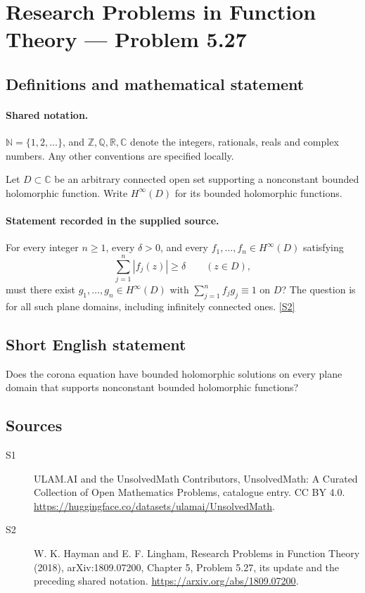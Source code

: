 \documentclass[11pt]{article}
\newcommand{\sref}[2]{\hyperlink{source:#1:#2}{[S#2]}}
\begin{document}
\section{Research Problems in Function Theory — Problem 5.27}\label{statement}

\subsection{Definitions and mathematical statement}

\paragraph{Shared notation.}$\mathbb N=\{1,2,\ldots\}$, and $\mathbb Z,\mathbb Q,\mathbb R,\mathbb C$ denote the integers, rationals, reals and complex numbers. Any other conventions are specified locally.


Let $D\subset\mathbb C$ be an arbitrary connected open set supporting a nonconstant bounded holomorphic function. Write $H^\infty(D)$ for its bounded holomorphic functions.
\paragraph{Statement recorded in the supplied source.}
For every integer $n\ge1$, every $\delta>0$, and every $f_1,\ldots,f_n\in H^\infty(D)$ satisfying
\[\sum_{j=1}^n|f_j(z)|\ge\delta\qquad(z\in D),\]
must there exist $g_1,\ldots,g_n\in H^\infty(D)$ with $\sum_{j=1}^n f_jg_j\equiv1$ on $D$? The question is for all such plane domains, including infinitely connected ones. \sref{statement}{2}
\subsection{Short English statement}
Does the corona equation have bounded holomorphic solutions on every plane domain that supports nonconstant bounded holomorphic functions?
\subsection{Sources}
\begin{description}
\item[\hypertarget{source:statement:1}{S1}] ULAM.AI and the UnsolvedMath Contributors, UnsolvedMath: A Curated Collection of Open Mathematics Problems, catalogue entry. CC BY 4.0. \url{https://huggingface.co/datasets/ulamai/UnsolvedMath}.
\item[\hypertarget{source:statement:2}{S2}] W. K. Hayman and E. F. Lingham, Research Problems in Function Theory (2018), arXiv:1809.07200, Chapter 5, Problem 5.27, its update and the preceding shared notation. \url{https://arxiv.org/abs/1809.07200}.
\end{description}
\label{end:statement}
\end{document}
